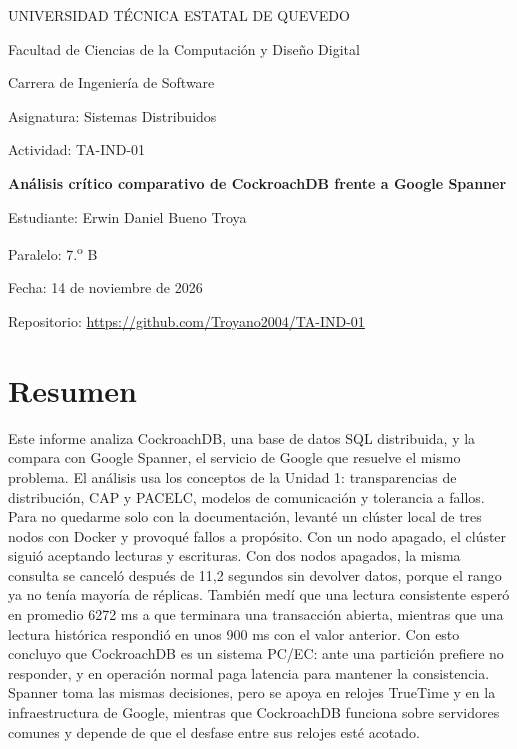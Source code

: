 \documentclass[12pt,a4paper]{article}
\newcommand{\repourl}{https://github.com/Troyano2004/TA-IND-01}
\begin{document}
\begin{titlepage}
  \centering
  {\large UNIVERSIDAD TÉCNICA ESTATAL DE QUEVEDO\par}
  \vspace{0.3cm}
  {\large Facultad de Ciencias de la Computación y Diseño Digital\par}
  \vspace{0.3cm}
  {\large Carrera de Ingeniería de Software\par}
  \vspace{1.5cm}
  {\large Asignatura: Sistemas Distribuidos\par}
  \vspace{0.3cm}
  {\large Actividad: TA-IND-01\par}
  \vspace{1.5cm}
  {\LARGE\bfseries Análisis crítico comparativo de CockroachDB frente a Google Spanner\par}
  \vfill
  {\large Estudiante: Erwin Daniel Bueno Troya\par}
  \vspace{0.3cm}
  {\large Paralelo: 7.\textsuperscript{o} B\par}
  \vspace{0.3cm}
  {\large Fecha: 14 de noviembre de 2026\par}
  \vspace{0.3cm}
  {\large Repositorio: \url{\repourl}\par}
\end{titlepage}

\section*{Resumen}

Este informe analiza CockroachDB, una base de datos SQL distribuida, y la compara con Google Spanner, el servicio de Google que resuelve el mismo problema. El análisis usa los conceptos de la Unidad 1: transparencias de distribución, CAP y PACELC, modelos de comunicación y tolerancia a fallos. Para no quedarme solo con la documentación, levanté un clúster local de tres nodos con Docker y provoqué fallos a propósito. Con un nodo apagado, el clúster siguió aceptando lecturas y escrituras. Con dos nodos apagados, la misma consulta se canceló después de 11,2 segundos sin devolver datos, porque el rango ya no tenía mayoría de réplicas. También medí que una lectura consistente esperó en promedio 6272 ms a que terminara una transacción abierta, mientras que una lectura histórica respondió en unos 900 ms con el valor anterior. Con esto concluyo que CockroachDB es un sistema PC/EC: ante una partición prefiere no responder, y en operación normal paga latencia para mantener la consistencia. Spanner toma las mismas decisiones, pero se apoya en relojes TrueTime y en la infraestructura de Google, mientras que CockroachDB funciona sobre servidores comunes y depende de que el desfase entre sus relojes esté acotado.
\end{document}
